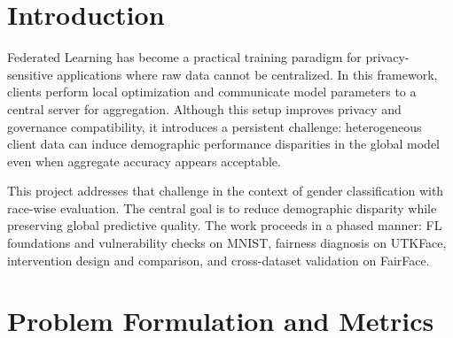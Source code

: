 \documentclass[11pt,a4paper]{article}
\begin{document}
\begin{abstract}
This report presents a formal investigation of fairness behavior in Federated Learning (FL) for binary gender classification. The study establishes that strong global accuracy can coexist with substantial race-wise disparity, and that this disparity can worsen under adversarial client behavior. The MNIST phase is used to demonstrate IID and non-IID federated behavior, while UTKFace and FairFace are evaluated using random client sharding with race-wise fairness analysis on the global test set. A sequence of fairness interventions is implemented and compared, including static weighted losses, fairness regularization, adversarial fairness learning, and an attack-based intervention. The proposed Dynamic Client-Adaptive Fairness Weighting (DCA-FW) method delivers the best fairness-utility trade-off. On UTKFace, the fairness gap reduces from 0.0852 to 0.0507 while maintaining overall accuracy near 0.873. On FairFace (50k subset), the fairness gap improves consistently from 0.0992 to 0.0812 across DCA-FW runs. The core conclusion is that client-level adaptive fairness signals are better aligned with decentralized optimization than global static penalties.
\end{abstract}

\clearpage
\tableofcontents
\clearpage

\section{Introduction}
Federated Learning has become a practical training paradigm for privacy-sensitive applications where raw data cannot be centralized. In this framework, clients perform local optimization and communicate model parameters to a central server for aggregation. Although this setup improves privacy and governance compatibility, it introduces a persistent challenge: heterogeneous client data can induce demographic performance disparities in the global model even when aggregate accuracy appears acceptable.

This project addresses that challenge in the context of gender classification with race-wise evaluation. The central goal is to reduce demographic disparity while preserving global predictive quality. The work proceeds in a phased manner: FL foundations and vulnerability checks on MNIST, fairness diagnosis on UTKFace, intervention design and comparison, and cross-dataset validation on FairFace.

\section{Problem Formulation and Metrics}
\end{document}
